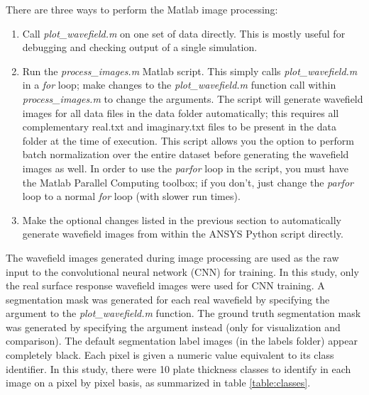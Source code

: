 \documentclass[11pt,letterpaper]{article}
\begin{document}
		There are three ways to perform the Matlab image processing:
		\begin{enumerate}
		\item Call \textit{plot\_wavefield.m} on one set of data directly. This is mostly useful for debugging and checking output of a single simulation.
		\item Run the \textit{process\_images.m} Matlab script. This simply calls \textit{plot\_wavefield.m} in a \textit{for} loop; make changes to the \textit{plot\_wavefield.m} function call within \textit{process\_images.m} to change the arguments. The script will generate wavefield images for all data files in the data folder automatically; this requires all complementary real.txt and imaginary.txt files to be present in the data folder at the time of execution. This script allows you the option to perform batch normalization over the entire dataset before generating the wavefield images as well. In order to use the \textit{parfor} loop in the script, you must have the Matlab Parallel Computing toolbox; if you don't, just change the \textit{parfor} loop to a normal \textit{for} loop (with slower run times).
		\item Make the optional changes listed in the previous section to automatically generate wavefield images from within the ANSYS Python script directly.
		\end{enumerate}
		The wavefield images generated during image processing are used as the raw input to the convolutional neural network (CNN) for training. In this study, only the real surface response wavefield images were used for CNN training. A segmentation mask  was generated for each real wavefield by specifying the  argument to the \textit{plot\_wavefield.m} function. The ground truth segmentation mask was generated by specifying the  argument instead (only for visualization and comparison). The default segmentation label images (in the labels folder) appear completely black. Each pixel is given a numeric value equivalent to its class identifier. In this study, there were 10 plate thickness classes to identify in each image on a pixel by pixel basis, as summarized in table \ref{table:classes}.
\end{document}
